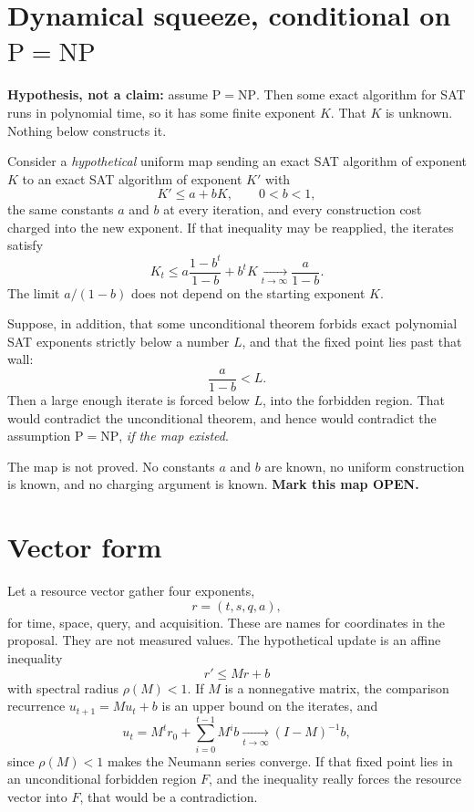 \documentclass{article}
\begin{document}
\section{Dynamical squeeze, conditional on \(\mathrm{P}=\mathrm{NP}\)}
\textbf{Hypothesis, not a claim:} assume \(\mathrm{P}=\mathrm{NP}\).
Then some exact algorithm for SAT runs in polynomial time, so it has some finite exponent \(K\).
That \(K\) is unknown.
Nothing below constructs it.

Consider a \emph{hypothetical} uniform map sending an exact SAT algorithm of exponent \(K\) to an exact SAT algorithm of exponent \(K'\) with
\[
K'\le a+bK, \qquad 0<b<1,
\]
the same constants \(a\) and \(b\) at every iteration, and every construction cost charged into the new exponent.
If that inequality may be reapplied, the iterates satisfy
\[
K_t
\le a\frac{1-b^t}{1-b}+b^t K
\xrightarrow[t\to\infty]{}
\frac{a}{1-b}.
\]
The limit \(a/(1-b)\) does not depend on the starting exponent \(K\).

Suppose, in addition, that some unconditional theorem forbids exact polynomial SAT exponents strictly below a number \(L\), and that the fixed point lies past that wall:
\[
\frac{a}{1-b}<L.
\]
Then a large enough iterate is forced below \(L\), into the forbidden region.
That would contradict the unconditional theorem, and hence would contradict the assumption \(\mathrm{P}=\mathrm{NP}\), \emph{if the map existed}.

The map is not proved.
No constants \(a\) and \(b\) are known, no uniform construction is known, and no charging argument is known.
\textbf{Mark this map OPEN.}

\section{Vector form}
Let a resource vector gather four exponents,
\[
r=(t,s,q,a),
\]
for time, space, query, and acquisition.
These are names for coordinates in the proposal.
They are not measured values.
The hypothetical update is an affine inequality
\[
r'\le Mr+b
\]
with spectral radius \(\rho(M)<1\).
If \(M\) is a nonnegative matrix, the comparison recurrence
\(u_{t+1}=Mu_t+b\) is an upper bound on the iterates, and
\[
u_t=M^t r_0+\sum_{i=0}^{t-1}M^i b
\xrightarrow[t\to\infty]{}
(I-M)^{-1}b,
\]
since \(\rho(M)<1\) makes the Neumann series converge.
If that fixed point lies in an unconditional forbidden region \(F\), and the inequality really forces the resource vector into \(F\), that would be a contradiction.
\end{document}
